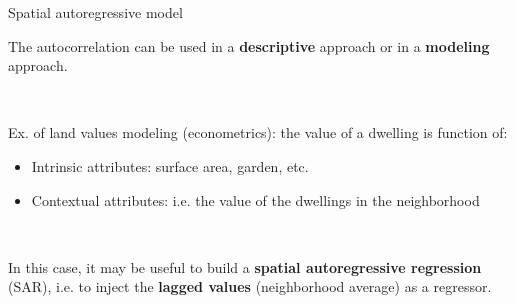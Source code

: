 \begin{frame}{Spatial autoregressive model}

The autocorrelation can be used in a \textbf{descriptive} approach or in a \textbf{modeling} approach.

~

Ex. of land values modeling (econometrics): the value of a dwelling is function of:

\begin{itemize}
  \item Intrinsic attributes: surface area, garden, etc.
  \item Contextual attributes: i.e. the value of the dwellings in the neighborhood
\end{itemize}

~

In this case, it may be useful to build a \textbf{spatial autoregressive regression} (SAR), i.e. to inject the \textbf{lagged values} (neighborhood average) as a regressor.

\end{frame}

